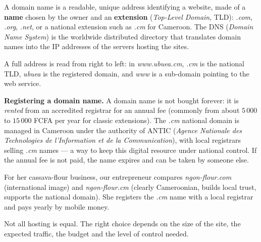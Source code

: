 \documentclass[11pt]{article}
\newcommand{\cle}[1]{{\popxbold\color{popdark}#1}}
\newcounter{popsec}
\newcounter{popsub}
\newcommand{\courssub}[1]{%
  \stepcounter{popsub}%
  \par\vspace{9pt}\noindent{\popxbold\fontsize{11.5}{13}\selectfont\color{popink}{\color{poporange}\thepopsec.\thepopsub}\hspace{6pt}#1}\par\nopagebreak\vspace{4pt}
}
\begin{document}
\begin{definition}
A \cle{domain name} is a readable, unique address identifying a website, made of a \textbf{name} chosen by the owner and an \textbf{extension} (\emph{Top-Level Domain}, TLD): \emph{.com}, \emph{.org}, \emph{.net}, or a national extension such as \emph{.cm} for Cameroon. The \cle{DNS} (\emph{Domain Name System}) is the worldwide distributed directory that translates domain names into the IP addresses of the servers hosting the sites.
\end{definition}

A full address is read from right to left: in \emph{www.ubuea.cm}, \emph{.cm} is the national TLD, \emph{ubuea} is the registered domain, and \emph{www} is a sub-domain pointing to the web service.

\textbf{Registering a domain name.} A domain name is not bought forever: it is \emph{rented} from an accredited \cle{registrar} for an annual fee (commonly from about $5\,000$ to $15\,000$ FCFA per year for classic extensions). The \emph{.cm} national domain is managed in Cameroon under the authority of \cle{ANTIC} (\emph{Agence Nationale des Technologies de l'Information et de la Communication}), with local registrars selling \emph{.cm} names --- a way to keep this digital resource under national control. If the annual fee is not paid, the name expires and can be taken by someone else.

\begin{exemplebox}
For her cassava-flour business, our entrepreneur compares \emph{ngon-flour.com} (international image) and \emph{ngon-flour.cm} (clearly Cameroonian, builds local trust, supports the national domain). She registers the \emph{.cm} name with a local registrar and pays yearly by mobile money.
\end{exemplebox}

\courssub{Types of Hosting}

Not all hosting is equal. The right choice depends on the size of the site, the expected traffic, the budget and the level of control needed.
\end{document}
